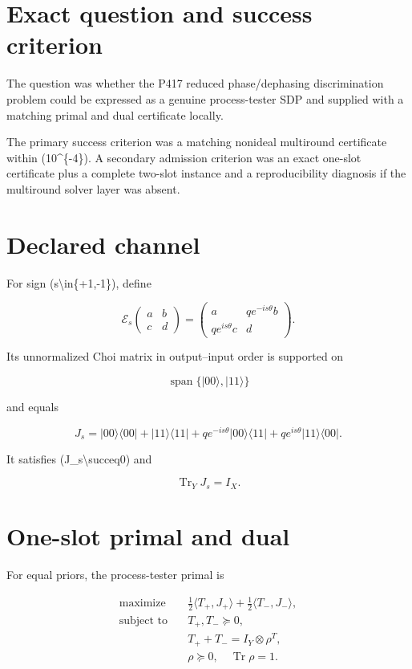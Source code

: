 \documentclass[11pt,a4paper,openany]{report}
\begin{document}
\section{Exact question and success criterion}

The question was whether the P417 reduced phase/\allowbreak{}dephasing discrimination problem could be expressed as a genuine process-tester SDP and supplied with a matching primal and dual certificate locally.

The primary success criterion was a matching nonideal multiround certificate within (10\textasciicircum{}\{-4\}). A secondary admission criterion was an exact one-slot certificate plus a complete two-slot instance and a reproducibility diagnosis if the multiround solver layer was absent.

\section{Declared channel}

For sign (s\textbackslash{}in\{+1,-1\}), define

\[
\mathcal E_s
\begin{pmatrix}a&b\\c&d\end{pmatrix}
=
\begin{pmatrix}
a&q e^{-is\theta}b\\
q e^{is\theta}c&d
\end{pmatrix}.
\]

Its unnormalized Choi matrix in output--input order is supported on

\[
\operatorname{span}\{|00\rangle,|11\rangle\}
\]

and equals

\[
J_s=
|00\rangle\langle00|+|11\rangle\langle11|
+q e^{-is\theta}|00\rangle\langle11|
+q e^{is\theta}|11\rangle\langle00|.
\]

It satisfies (J\_s\textbackslash{}succeq0) and

\[
\operatorname{Tr}_{Y}J_s=I_X.
\]

\section{One-slot primal and dual}

For equal priors, the process-tester primal is

\[
\begin{aligned}
\text{maximize}\quad &
\frac12\langle T_+,J_+\rangle
+\frac12\langle T_-,J_-\rangle,\\
\text{subject to}\quad &T_+,T_-\succeq0,\\
&T_++T_-=I_Y\otimes\rho^T,\\
&\rho\succeq0,\quad\operatorname{Tr}\rho=1.
\end{aligned}
\]
\end{document}
